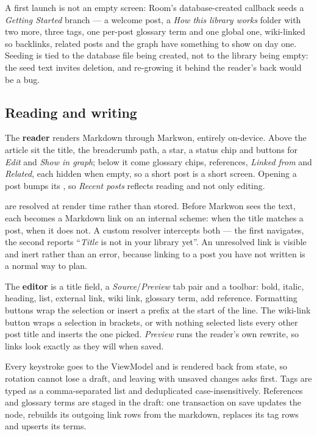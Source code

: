 \medskip
A first launch is not an empty screen: Room's database-created callback seeds a \emph{Getting
Started} branch --- a welcome post, a \emph{How this library works} folder with two more, three
tags, one per-post glossary term and one global one, wiki-linked so backlinks, related posts and
the graph have something to show on day one. Seeding is tied to the database file being created,
not to the library being empty: the seed text invites deletion, and re-growing it behind the
reader's back would be a bug.

\subsection{Reading and writing}

The \textbf{reader} renders Markdown through Markwon, entirely on-device. Above the article sit
the title, the breadcrumb path, a star, a status chip and buttons for \emph{Edit} and \emph{Show in
graph}; below it come glossary chips, references, \emph{Linked from} and \emph{Related}, each
hidden when empty, so a short post is a short screen. Opening a post bumps its , so
\emph{Recent posts} reflects reading and not only editing.

 are resolved at render time rather than stored. Before Markwon sees the text,
each \code{[[Title]]} becomes a Markdown link on an internal scheme:  when
the title matches a post,  when it does not. A custom resolver
intercepts both --- the first navigates, the second reports ``\emph{Title} is not in your library
yet''. An unresolved link is visible and inert rather than an error, because linking to a post you
have not written is a normal way to plan.

The \textbf{editor} is a title field, a \emph{Source}/\emph{Preview} tab pair and a toolbar: bold,
italic, heading, list, external link, wiki link, glossary term, add reference. Formatting buttons
wrap the selection or insert a prefix at the start of the line. The wiki-link button wraps a
selection in brackets, or with nothing selected lists every other post title and inserts the one
picked. \emph{Preview} runs the reader's own rewrite, so links look exactly as they will when saved.

Every keystroke goes to the ViewModel and is rendered back from state, so rotation cannot lose a
draft, and leaving with unsaved changes asks first. Tags are typed as a comma-separated list and
deduplicated case-insensitively. References and glossary terms are staged in the draft: one
transaction on save updates the node, rebuilds its outgoing link rows from the markdown, replaces
its tag rows and upserts its terms.

